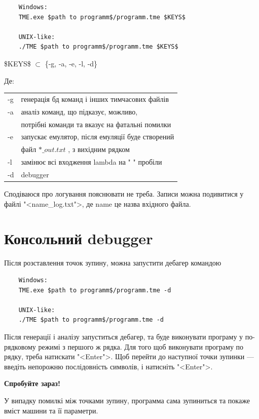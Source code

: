 \documentclass[oneside,final,14pt]{extreport}
\begin{document}
		
\begin{tcolorbox}	
\begin{verbatim}
	Windows:
	TME.exe $path to programm$/programm.tme $KEYS$

	UNIX-like:
	./TME $path to programm$/programm.tme $KEYS$
\end{verbatim}
\end{tcolorbox}
		

\$KEYS\$ $\subset$ \{-g, -a, -e, -l, -d\}
			
		
		Де:
		
		
\begin{tabular}{ l l }
	-g & генерація бд команд і інших тимчасових файлів \\
	-a & аналіз команд, що підказує, можливо, \\
	   & потрібні команди та вказує на фатальні помилки \\
	-e & запускає емулятор, після емуляції буде створений\\
	   &  файл $*\_out.txt$ , з вихідним рядком \\
	-l & замінює всі входження lambda на " " пробіли\\
	-d & debugger\\ 
\end{tabular}

Сподіваюся про логування пояснювати не треба. Записи можна подивитися у файлі "<name\_log.txt">, де name це назва вхідного файла.

\section{Консольний debugger}
Після розставлення точок зупину, можна запустити дебагер командою
\begin{tcolorbox}	
\begin{verbatim}
	Windows:
	TME.exe $path to programm$/programm.tme -d

	UNIX-like:
	./TME $path to programm$/programm.tme -d
\end{verbatim}
\end{tcolorbox}

Після генерації і аналізу запуститься дебагер, та буде виконувати програму у по-рядковому режимі з першого ж рядка.
Для того щоб виконувати програму по рядку, треба натискати "<Enter">. Щоб перейти до наступної точки зупинки --- введіть непорожню послідовність символів, і натисніть "<Enter">.

{\bfseries Спробуйте зараз!}

У випадку помилкі між точками зупину, программа сама зупиниться та покаже вміст машини та її параметри.
\end{document}
